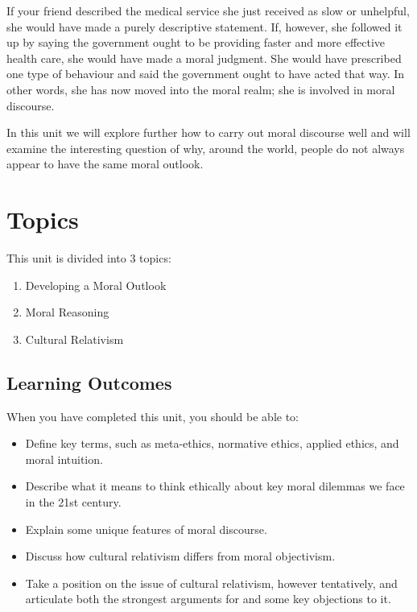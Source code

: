 \documentclass[
]{book}
\providecommand{\tightlist}{%
  \setlength{\itemsep}{0pt}\setlength{\parskip}{0pt}}
\begin{document}
If your friend described the medical service she just received as slow or unhelpful, she would have made a purely descriptive statement. If, however, she followed it up by saying the government ought to be providing faster and more effective health care, she would have made a moral judgment. She would have prescribed one type of behaviour and said the government ought to have acted that way. In other words, she has now moved into the moral realm; she is involved in moral discourse.

In this unit we will explore further how to carry out moral discourse well and will examine the interesting question of why, around the world, people do not always appear to have the same moral outlook.

\hypertarget{topics}{%
\section*{Topics}\label{topics}}

This unit is divided into 3 topics:

\begin{enumerate}
\def\labelenumi{\arabic{enumi}.}
\tightlist
\item
  Developing a Moral Outlook\\
\item
  Moral Reasoning\\
\item
  Cultural Relativism
\end{enumerate}

\hypertarget{learning-outcomes}{%
\subsection*{Learning Outcomes}\label{learning-outcomes}}

When you have completed this unit, you should be able to:

\begin{itemize}
\tightlist
\item
  Define key terms, such as meta-ethics, normative ethics, applied ethics, and moral intuition.\\
\item
  Describe what it means to think ethically about key moral dilemmas we face in the 21st century.\\
\item
  Explain some unique features of moral discourse.\\
\item
  Discuss how cultural relativism differs from moral objectivism.\\
\item
  Take a position on the issue of cultural relativism, however tentatively, and articulate both the strongest arguments for and some key objections to it.
\end{itemize}
\end{document}
